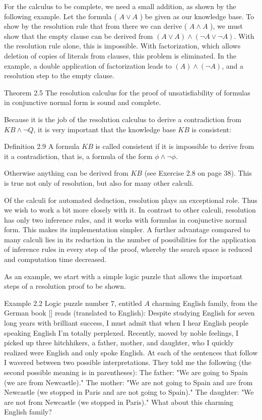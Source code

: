 \documentclass[10pt]{book}
\begin{document}
For the calculus to be complete, we need a small addition, as shown by the following example. Let the formula ( $A \vee A$ ) be given as our knowledge base. To show by the resolution rule that from there we can derive ( $A \wedge A$ ), we must show that the empty clause can be derived from $(A \vee A) \wedge(\neg A \vee \neg A)$. With the resolution rule alone, this is impossible. With factorization, which allows deletion of copies of literals from clauses, this problem is eliminated. In the example, a double application of factorization leads to $(A) \wedge(\neg A)$, and a resolution step to the empty clause.

\begin{displayquote}
Theorem 2.5 The resolution calculus for the proof of unsatisfiability of formulas in conjunctive normal form is sound and complete.
\end{displayquote}

Because it is the job of the resolution calculus to derive a contradiction from $K B \wedge \neg Q$, it is very important that the knowledge base $K B$ is consistent:

Definition 2.9 A formula $K B$ is called consistent if it is impossible to derive from it a contradiction, that is, a formula of the form $\phi \wedge \neg \phi$.

Otherwise anything can be derived from $K B$ (see Exercise 2.8 on page 38). This is true not only of resolution, but also for many other calculi.

Of the calculi for automated deduction, resolution plays an exceptional role. Thus we wish to work a bit more closely with it. In contrast to other calculi, resolution has only two inference rules, and it works with formulas in conjunctive normal form. This makes its implementation simpler. A further advantage compared to many calculi lies in its reduction in the number of possibilities for the application of inference rules in every step of the proof, whereby the search space is reduced and computation time decreased.

As an example, we start with a simple logic puzzle that allows the important steps of a resolution proof to be shown.

Example 2.2 Logic puzzle number 7, entitled $A$ charming English family, from the German book [\cite{berrondo1989fallgruben}] reads (translated to English):
Despite studying English for seven long years with brilliant success, I must admit that when I hear English people speaking English I'm totally perplexed. Recently, moved by noble feelings, I picked up three hitchhikers, a father, mother, and daughter, who I quickly realized were English and only spoke English. At each of the sentences that follow I wavered between two possible interpretations. They told me the following (the second possible meaning is in parentheses): The father: "We are going to Spain (we are from Newcastle)." The mother: "We are not going to Spain and are from Newcastle (we stopped in Paris and are not going to Spain)." The daughter: "We are not from Newcastle (we stopped in Paris)." What about this charming English family?
\end{document}
